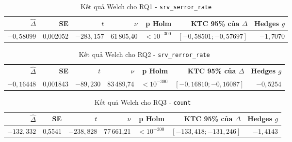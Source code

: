 \documentclass[../main.tex]{subfiles}
\begin{document}
\begin{table}[H]
\centering
\caption{Kết quả Welch cho RQ1 - \texttt{srv\_serror\_rate}}
\label{tab:t35:rq1}
\small
\begin{tabular}{rrrrrrr}
\toprule
$\widehat\Delta$ & SE & $t$ & $\nu$ & p Holm & KTC 95\% của $\Delta$ & Hedges $g$ \\
\midrule
$-0{,}58099$ & 0,002052 & $-283{,}157$ & 61\,805,40 & $<10^{-300}$ & $[-0{,}58501;-0{,}57697]$ & $-1{,}7070$ \\
\bottomrule
\end{tabular}
\end{table}

\begin{table}[H]
\centering
\caption{Kết quả Welch cho RQ2 - \texttt{srv\_rerror\_rate}}
\label{tab:t35:rq2}
\small
\begin{tabular}{rrrrrrr}
\toprule
$\widehat\Delta$ & SE & $t$ & $\nu$ & p Holm & KTC 95\% của $\Delta$ & Hedges $g$ \\
\midrule
$-0{,}16448$ & 0,001843 & $-89{,}230$ & 83\,489,74 & $<10^{-300}$ & $[-0{,}16810;-0{,}16087]$ & $-0{,}5254$ \\
\bottomrule
\end{tabular}
\end{table}

\begin{table}[H]
\centering
\caption{Kết quả Welch cho RQ3 - \texttt{count}}
\label{tab:t35:rq3}
\small
\begin{tabular}{rrrrrrr}
\toprule
$\widehat\Delta$ & SE & $t$ & $\nu$ & p Holm & KTC 95\% của $\Delta$ & Hedges $g$ \\
\midrule
$-132{,}332$ & 0,5541 & $-238{,}828$ & 77\,661,21 & $<10^{-300}$ & $[-133{,}418;-131{,}246]$ & $-1{,}4143$ \\
\bottomrule
\end{tabular}
\end{table}
\end{document}
